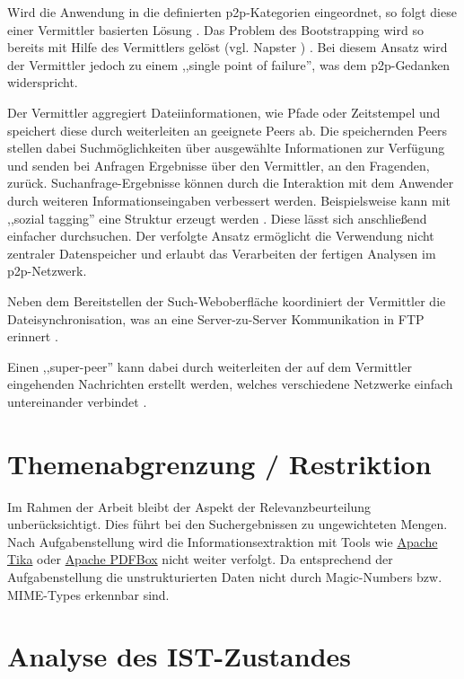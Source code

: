 \documentclass[oneside, ngerman, toc=bibliography,bibliography=totoc,listof=entryprefix, open=right,numbers=noenddot,fontsize=12pt]{scrbook}
\begin{document}
Wird die Anwendung in die definierten \acrshort{p2p}-Kategorien eingeordnet, so folgt diese einer Vermittler basierten Lösung \cite{backx2002comparison}. Das Problem des Bootstrapping wird so bereits mit Hilfe des Vermittlers gelöst (vgl. { Napster} \cite{mahlmann2007peer}) \cite{4144906}. Bei diesem Ansatz wird der Vermittler jedoch zu einem ,,single point of failure'', was dem \acrshort{p2p}-Gedanken widerspricht. 

Der Vermittler aggregiert Dateiinformationen, wie Pfade oder Zeitstempel und speichert diese durch weiterleiten an geeignete Peers ab. Die speichernden Peers stellen dabei Suchmöglichkeiten über ausgewählte Informationen zur Verfügung und senden bei Anfragen Ergebnisse über den Vermittler, an den Fragenden, zurück.
Suchanfrage-Ergebnisse können durch die Interaktion mit dem Anwender durch weiteren Informationseingaben verbessert werden.
Beispielsweise kann mit ,,sozial tagging'' eine Struktur erzeugt werden \cite{gaiser2008good}. Diese lässt sich anschließend einfacher durchsuchen. Der verfolgte Ansatz ermöglicht die Verwendung nicht zentraler Datenspeicher und erlaubt das Verarbeiten der fertigen Analysen im \acrshort{p2p}-Netzwerk.

Neben dem Bereitstellen der Such-Weboberfläche koordiniert der Vermittler die Dateisynchronisation, was an eine Server-zu-Server Kommunikation in FTP erinnert \cite{rfc959}.

Einen ,,super-peer'' kann dabei durch weiterleiten der auf dem Vermittler eingehenden Nachrichten erstellt werden, welches verschiedene Netzwerke einfach untereinander verbindet \cite{yang2003designing}.

\section{Themenabgrenzung / Restriktion}
Im Rahmen der Arbeit bleibt der Aspekt der Relevanzbeurteilung unberücksichtigt. Dies führt bei den Suchergebnissen zu ungewichteten Mengen. Nach Aufgabenstellung wird die Informationsextraktion mit Tools wie \href{http://tika.apache.org/}{Apache Tika} oder  \href{http://pdfbox.apache.org/}{Apache PDFBox} nicht weiter verfolgt. Da  entsprechend der Aufgabenstellung die unstrukturierten Daten nicht durch {Magic-Numbers bzw. MIME-Types} erkennbar sind.


\section{Analyse des IST-Zustandes}\label{sec:ist}
\end{document}
